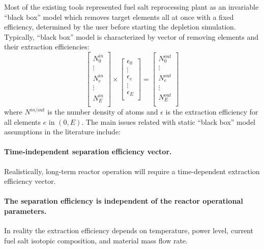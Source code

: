 Most of the existing tools represented fuel salt reprocessing plant as an 
invariable ``black box'' model which removes target elements all at once with 
a fixed efficiency, determined by the user before starting the depletion 
simulation. Typically, ``black box'' model is characterized by vector of  
removing elements and their extraction efficiencies:
\begin{equation}
\begin{bmatrix}
N^{in}_{0} \\ \vdots \\ N^{in}_{e} \\ \vdots \\ N^{in}_{E} \\
\end{bmatrix} 
\times
\begin{bmatrix}
\epsilon_{0} \\ \vdots \\ \epsilon_{e} \\ \vdots \\ \epsilon_{E} \\
\end{bmatrix} =
\begin{bmatrix}
N^{out}_{0}\\ \vdots \\ N^{out}_{e} \\ \vdots \\N^{out}_{E}  \\
\end{bmatrix}
\end{equation}
where $N^{in/out}$ is the number density of atoms and $\epsilon$ is the 
extraction efficiency for all elements $e$ in $(0, E)$. The main issues 
related with static ``black box'' model assumptions in the literature include: 
\paragraph{Time-independent separation efficiency vector.} Realistically, 
	long-term reactor operation will require a time-dependent extraction 
	efficiency vector.
\paragraph{The separation efficiency is independent of the reactor operational 
	parameters.} In reality the extraction efficiency depends on temperature, 
	power level, current fuel salt isotopic composition, and material mass 
	flow rate.
